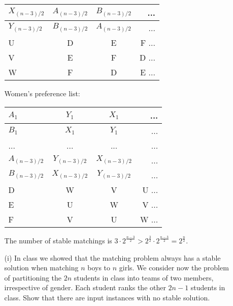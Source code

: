 \documentclass{article}       %
\begin{document}
\begin{enumerate}
\begin{enumerate}
\begin{tabular}{ | l | c | c | r  }
               	$X_{(n-3)/2}$ & $A_{(n-3)/2}$ & $B_{(n-3)/2}$ & ... \\ \hline
               	$Y_{(n-3)/2}$ & $B_{(n-3)/2}$ & $A_{(n-3)/2}$ & ... \\ \hline
               	U & D & E & F ...\\ \hline
               	V & E & F & D  ...\\ \hline
               	W & F & D & E ...\\ \hline
               \end{tabular} \newline
               Women's preference list:
               \begin{tabular}{ | l | c | c | r  }
               	\hline
               	$A_1$ & $Y_1$ & $X_1$ &... \\ \hline
               	$B_1$ & $X_1$ & $Y_1$ &... \\
               	... & ... & ... & ... \\
               	$A_{(n-3)/2}$ & $Y_{(n-3)/2}$ & $X_{(n-3)/2}$ & ... \\ \hline
               	$B_{(n-3)/2}$ & $X_{(n-3)/2}$ & $Y_{(n-3)/2}$ & ... \\ \hline
               	D & W & V & U ...\\ \hline
               	E & U & W & V ... \\ \hline
               	F & V & U & W ... \\ \hline
               \end{tabular}\newline
               The number of stable matchings is $3 \cdot 2^{\frac{n-3}{2}} > 2^{\frac{3}{2}} \cdot 2^{\frac{n-3}{2}} = 2^{\frac{n}{2}}$.\newline
                
                \item[(i)] In class we showed that the matching problem always has a stable solution when matching $n$ boys to $n$ girls. We consider now the problem of partitioning the $2n$ students in class into teams of two members, irrespective of gender. Each student ranks the other $2n - 1$ students in class. Show that there are input instances with no stable solution.\newline
                

\end{enumerate}
\end{enumerate}
\end{document}
